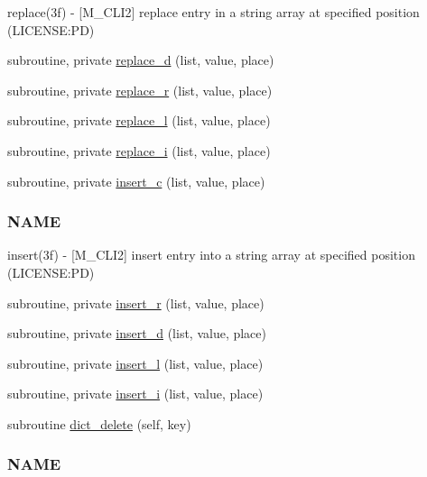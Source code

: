 \begin{DoxyCompactItemize}
\begin{DoxyCompactList}
replace(3f) -\/ \mbox{[}M\+\_\+\+C\+L\+I2\mbox{]} replace entry in a string array at specified position (L\+I\+C\+E\+N\+SE\+:PD) \end{DoxyCompactList}\item 
subroutine, private \mbox{\hyperlink{namespacem__cli2_ac327823dd714cd4c1667666158f0c135}{replace\+\_\+d}} (list, value, place)
\item 
subroutine, private \mbox{\hyperlink{namespacem__cli2_abe681a8b55ae238b029766713a79210a}{replace\+\_\+r}} (list, value, place)
\item 
subroutine, private \mbox{\hyperlink{namespacem__cli2_ae4a1802207f6b67e36cbf89003d6fb55}{replace\+\_\+l}} (list, value, place)
\item 
subroutine, private \mbox{\hyperlink{namespacem__cli2_a0a591fd55e8010f26eb6f9f6bafc1ddb}{replace\+\_\+i}} (list, value, place)
\item 
subroutine, private \mbox{\hyperlink{namespacem__cli2_ab3f2aa827b3b7ff419bcdc3ccb2672b3}{insert\+\_\+c}} (list, value, place)
\begin{DoxyCompactList}\small\item\em \subsubsection*{N\+A\+ME}

insert(3f) -\/ \mbox{[}M\+\_\+\+C\+L\+I2\mbox{]} insert entry into a string array at specified position (L\+I\+C\+E\+N\+SE\+:PD) \end{DoxyCompactList}\item 
subroutine, private \mbox{\hyperlink{namespacem__cli2_ae43e655d3678fcc31824a3e9db3daae1}{insert\+\_\+r}} (list, value, place)
\item 
subroutine, private \mbox{\hyperlink{namespacem__cli2_a737ae8e6f73a3fc8cc260732c047fafb}{insert\+\_\+d}} (list, value, place)
\item 
subroutine, private \mbox{\hyperlink{namespacem__cli2_a7e5ee66813d8f6db9d48ebdc350a6b3e}{insert\+\_\+l}} (list, value, place)
\item 
subroutine, private \mbox{\hyperlink{namespacem__cli2_afa6f00a57f1252ba5daa0c440a23ffbb}{insert\+\_\+i}} (list, value, place)
\item 
subroutine \mbox{\hyperlink{namespacem__cli2_afcdd2c59305faf341ebf8ec3b115a05e}{dict\+\_\+delete}} (self, key)
\begin{DoxyCompactList}\small\item\em \subsubsection*{N\+A\+ME}


\end{DoxyCompactList}
\end{DoxyCompactItemize}
